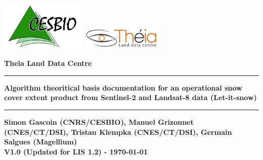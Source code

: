 \begin{titlepage}
\includegraphics[width=0.3\textwidth]{./images/logo_cesbio.png}
\hspace{5cm}
\includegraphics[width=0.3\textwidth]{./images/Theia_en.png}

\vspace{3cm}



\textcolor{PineGreen}{ \huge \bfseries Theia Land Data Centre\\ }
\rule{\linewidth}{0.5mm}
\begin{center}
{ \huge \bfseries Algorithm theoritical basis documentation for an operational snow cover extent product from Sentinel-2 and Landsat-8 data (Let-it-snow)\\}
\rule{\linewidth}{0.5mm}
{ \large \bfseries Simon Gascoin (CNRS/CESBIO), Manuel Grizonnet (CNES/CT/DSI), Tristan Klempka (CNES/CT/DSI), Germain Salgues (Magellium) \\ }
{ \large \bfseries V1.0 (Updated for LIS 1.2) - \today \\ }



\end{center}
\end{titlepage}
